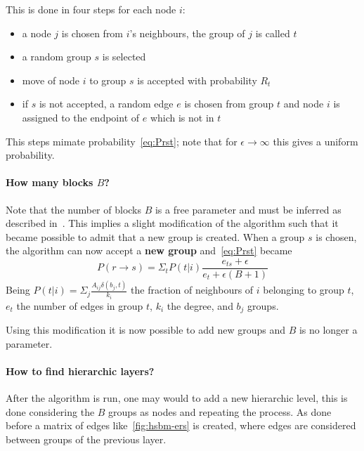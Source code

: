 This is done in four steps for each node $i$:
\begin{itemize}
  \item a node $j$ is chosen from $i$'s neighbours, the group of $j$ is called
  $t$
  \item a random group $s$ is selected
  \item move of node $i$ to group $s$ is accepted with probability $R_t$
  \item if $s$ is not accepted, a random edge $e$ is chosen from group $t$ and node $i$ is assigned to the endpoint of $e$ which is not in $t$
\end{itemize}
This steps mimate probability~\ref{eq:Prst}; note that for $\epsilon\to\infty$ this gives a uniform probability.

\paragraph{How many blocks $B$?}
Note that the number of blocks $B$ is a free parameter and must be inferred as described in~\cite{peixoto2017nonparametric}.
This implies a slight modification of the algorithm such that
it became possible to admit that a new group is created.
When a group $s$ is chosen, the algorithm can now accept a \textbf{new group} and~\ref{eq:Prst} became
\begin{equation}\label{eq:PrstB1}
  P(r\to s)=\Sigma_t P(t|i)\frac{e_{ts}+\epsilon}{e_t+\epsilon (B+1)}
\end{equation}
Being $P(t|i)=\Sigma_j\frac{A_{ij}\delta(b_j, t)}{k_i}$ the fraction of neighbours of $i$ belonging to group $t$, $e_t$ the number of edges in group $t$,
$k_i$ the degree, and $b_j$ groups.

Using this modification it is now possible to add new groups and $B$ is no longer a parameter.

\paragraph{How to find hierarchic layers?}
After the algorithm is run, one may would to add a new hierarchic level, this is done considering the $B$ groups as nodes and repeating the process.
As done before a matrix of edges like~\ref{fig:hsbm-ers} is created, where edges
are considered between groups of the previous layer.

